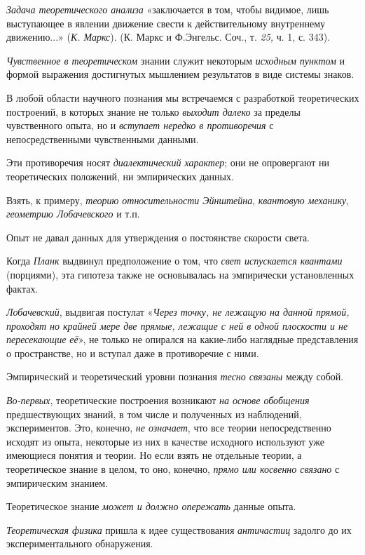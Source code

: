 \documentclass[a4paper,14pt,russian]{extreport}
\begin{document}
\emph{Задача теоретического анализа} «заключается в том, чтобы видимое, лишь выступающее в явлении движение свести к действительному внутреннему движению...» (\emph{К. Маркс}). (К. Маркс и Ф.Энгельс. Соч., т. \emph{25,} ч. 1, с. 343).

\emph{Чувственное в теоретическом} знании служит некоторым \emph{исходным пунктом} и формой выражения достигнутых мышлением результатов в виде системы знаков.

В любой области научного познания мы встречаемся с разработкой теоретических построений, в которых знание не только \emph{выходит далеко} за пределы чувственного опыта, но и \emph{вступает нередко в противоречия} с непосредственными чувственными данными.

Эти противоречия носят \emph{диалектический характер}; они не опровергают ни теоретических положений, ни эмпирических данных.

Взять, к примеру, \emph{теорию относительности Эйнштейна}, \emph{квантовую механику}, \emph{геометрию Лобачевского} и т.п.

Опыт не давал данных для утверждения о постоянстве скорости света.

Когда \emph{Планк} выдвинул предположение о том, что \emph{свет испускается квантами} (порциями), эта гипотеза также не основывалась на эмпирически установленных фактах.

\emph{Лобачевский}, выдвигая постулат «\emph{Через точку, не лежащую на данной прямой, проходят но крайней мере две прямые, лежащие с ней в одной плоскости и не пересекающие её}», не только не опирался на какие-либо наглядные представления о пространстве, но и вступал даже в противоречие с ними.

Эмпирический и теоретический уровни познания \emph{тесно связаны} между собой.

\emph{Во-первых}, теоретические построения возникают \emph{на основе обобщения} предшествующих знаний, в том числе и полученных из наблюдений, экспериментов. Это, конечно, \emph{не означает}, что все теории непосредственно исходят из опыта, некоторые из них в качестве исходного используют уже имеющиеся понятия и теории. Но если взять не отдельные теории, а теоретическое знание в целом, то оно, конечно, \emph{прямо или косвенно связано} с эмпирическим знанием.

Теоретическое знание \emph{может и должно опережать} данные опыта.

\emph{Теоретическая физика} пришла к идее существования \emph{античастиц} задолго до их экспериментального обнаружения.
\end{document}
